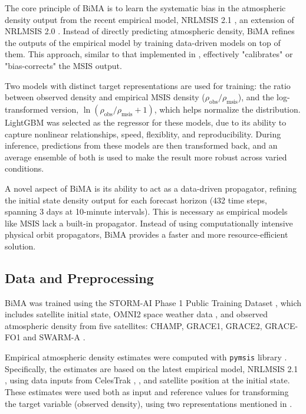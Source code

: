 \documentclass[11pt,a4paper]{storm-ai_report}
\begin{document}
The core principle of BiMA is to learn the systematic bias in the atmospheric density output from the recent empirical model, NRLMSIS 2.1 \cite{Emmert2022NRLMSIS21}, an extension of NRLMSIS 2.0 \cite{Emmert2020NRLMSIS2}. Instead of directly predicting atmospheric density, BiMA refines the outputs of the empirical model by training data-driven models on top of them. This approach, similar to that implemented in \cite{Licata2022MSISUQ}, effectively "calibrates" or "bias-corrects" the MSIS output.

Two models with distinct target representations are used for training: the ratio between observed density and empirical MSIS density ($\rho_{\text{obs}} / \rho_{\text{msis}}$), and the log-transformed version, $\ln(\rho_{\text{obs}} / \rho_{\text{msis}}+1)$, which helps normalize the distribution. LightGBM \cite{Ke2017lightgbm} was selected as the regressor for these models, due to its ability to capture nonlinear relationships, speed, flexiblity, and reproducibility. During inference, predictions from these models are then transformed back, and an average ensemble of both is used to make the result more robust across varied conditions.

A novel aspect of BiMA is its ability to act as a data-driven propagator, refining the initial state density output for each forecast horizon (432 time steps, spanning 3 days at 10-minute intervals). This is necessary as empirical models like MSIS lack a built-in propagator. Instead of using computationally intensive physical orbit propagators, BiMA provides a faster and more resource-efficient solution.

\subsection{Data and Preprocessing}
BiMA was trained using the STORM-AI Phase 1 Public Training Dataset \cite{stormAI}, which includes satellite initial state, OMNI2 space weather data \cite{OMNI2}, and observed atmospheric density from five satellites: CHAMP, GRACE1, GRACE2, GRACE-FO1 and SWARM-A \cite{SWARM}. 

Empirical atmospheric density estimates were computed with \texttt{pymsis} library \cite{Lucas2022pymsis}. Specifically, the estimates are based on the latest empirical model, NRLMSIS 2.1 \cite{Emmert2022NRLMSIS21}, using data inputs from CelesTrak \cite{CelesTrak}, \cite{Matzka2021Kp}, and satellite position at the initial state. These estimates were used both as input and reference values for transforming the target variable (observed density), using two representations mentioned in .
\end{document}
